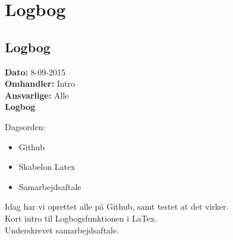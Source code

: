 \chapter{Logbog}
\section{Logbog}

\textbf{Dato:} 8-09-2015 \\
\textbf{Omhandler:} Intro \\
\textbf{Ansvarlige:} Alle \\
\textbf{Logbog}

Dagsorden:
\begin{itemize}
	\item Github
	\item Skabelon Latex
	\item Samarbejdsaftale
\end{itemize}

Idag har vi oprettet alle på Github, samt testet at det virker.\\
Kort intro til Logbogsfunktionen i LaTex.\\
Underskrevet samarbejdsaftale.
